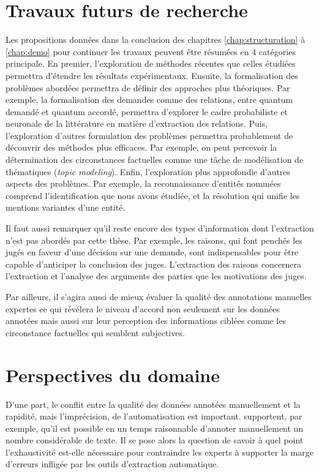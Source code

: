 \section{Travaux futurs de recherche}
\label{sec:conclusion:extensions}
Les propositions données dans la conclusion des chapitres \ref{chap:structuration} à \ref{chap:demo} pour continuer les travaux peuvent être résumées en 4 catégories principale. En premier, l'exploration de méthodes récentes que celles étudiées permettra d'étendre les résultats expérimentaux. Ensuite, la formalisation des problèmes abordées permettra de définir des approches plus théoriques. Par exemple, la formalisation des demandes comme des relations, entre quantum demandé et quantum accordé, permettra d'explorer le cadre probabiliste et neuronale de la littérature en matière d'extraction des relations. Puis, l'exploration d'autres formulation des problèmes permettra probablement de découvrir des méthodes plus efficaces. Par exemple, on peut percevoir la détermination des circonstances factuelles comme une tâche de modélisation de thématiques (\textit{topic modeling}). Enfin, l'exploration plus approfondie d'autres aspects des problèmes. Par exemple, la reconnaissance d'entités nommées comprend l'identification que nous avons étudiée, et la résolution qui unifie les mentions variantes d'une entité.

Il faut aussi remarquer qu'il reste encore des types d'information dont l'extraction n'est pas abordés par cette thèse. Par exemple, les raisons, qui  font penchés les jugés en faveur d'une décision sur une demande, sont indispensables pour être capable d'anticiper la conclusion des juges. L'extraction des raisons concernera l'extraction et l'analyse des arguments des parties que les motivations des juges.

 Par ailleurs, il s'agira aussi de mieux évaluer la qualité des annotations manuelles expertes ce qui révélera le niveau d'accord non seulement sur les données annotées mais aussi sur leur perception des informations ciblées comme les circonstance factuelles qui semblent subjectives. 

\section{Perspectives du domaine}
\label{sec:conclusion:perspectives}

D'une part, le conflit entre la qualité des données annotées manuellement et la rapidité, mais l'imprécision, de l'automatisation est important. \cite{Galgani2015lexa} supportent, par exemple, qu'il est possible en un temps raisonnable d'annoter manuellement un nombre considérable de texte. Il se pose alors la question de savoir à quel point l'exhaustivité est-elle nécessaire pour contraindre les experts à supporter la marge d'erreurs infligée par les outils d'extraction automatique.

